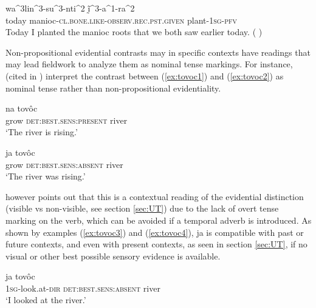 \documentclass[oneside,a4paper,11pt]{article}
\newcommand{\ipa}[1]{{\phon \mbox{#1}}} %
\begin{document}
\begin{exe}
\ex \label{ex:walinsunti}
\gll  \ipa{hĩ^1na^2su^2} \ipa{wa^3lin^3-su^3-nti^2} \ipa{ḭ̃^3-a^1-ra^2} \\
today manioc-\textsc{cl.bone.like-observ.rec.pst.given} plant-\textsc{1sg-pfv} \\
\glt Today I planted the manioc roots that we both saw earlier today. (\citealt[290, ex 62.]{lowe99nambiquara} ) 
  \end{exe}

Non-propositional evidential contrasts may in specific contexts have readings that may lead fieldwork to analyze them as nominal tense markings. For instance, \citet[631]{campbell12chaco} (cited in \citealt{gutierrez14determiners}) interpret the contrast between (\ref{ex:tovoc1}) and (\ref{ex:tovoc2}) as nominal tense rather than non-propositional evidentiality.

\begin{exe}
\ex \label{ex:tovoc1}
\gll \ipa{tsej} \ipa{na} \ipa{tovôc} \\
  grow \textsc{det:best.sens:present} river \\
\glt `The river is rising.'
\end{exe}


\begin{exe}
\ex \label{ex:tovoc2}
\gll \ipa{tsej} \ipa{ja} \ipa{tovôc} \\
 grow \textsc{det:best.sens:absent} river \\
\glt `The river was rising.'
\end{exe}

\citet{gutierrez14determiners} however points out that this is a contextual reading of the evidential distinction (visible vs non-visible, see section \ref{sec:UT}) due to the lack of overt tense marking on the verb, which can be avoided if a temporal adverb is introduced. As shown by examples (\ref{ex:tovoc3}) and (\ref{ex:tovoc4}), \ipa{ja} is compatible with past or future contexts, and even with present contexts, as seen in section \ref{sec:UT}, if no visual or other best possible sensory evidence is available.


\begin{exe}
\ex \label{ex:tovoc3}
\gll \ipa{j-ovalh-ei} \ipa{ja} \ipa{tovôc} \\
 \textsc{1sg}-look.at-\textsc{dir} \textsc{det:best.sens:absent} river \\
\glt `I looked at the river.'
\end{exe}
\end{document}
